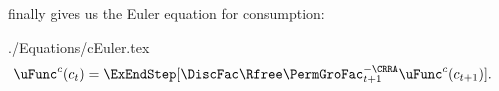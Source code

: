 \documentclass[titlepage, headings=optiontotocandhead]{\econtex}
\begin{document}
finally gives us the Euler equation for consumption:
\begin{verbatimwrite}{./Equations/cEuler.tex}
  \begin{equation}\begin{gathered}\begin{aligned}
        \uFunc^{{c}}({c}_{t})  & = \ExEndStep[\DiscFac\Rfree \PermGroFac_{t+1}^{-\CRRA}\uFunc^{{c}}({c}_{t+1})]. \label{eq:cEuler}
                                  \end{aligned}\end{gathered}\end{equation}
\end{verbatimwrite}
\unskip
%
\end{document}
